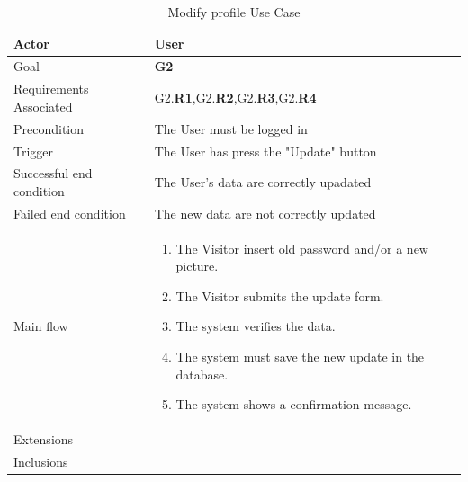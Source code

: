 \newline
\begin{table}[htb]
\begin{center}
\renewcommand{\arraystretch}{1.5}
\begin{tabular}{|l|p{}|}
\hline
Actor & User \\ \hline
Goal & \textbf{G2} \\ \hline
Requirements Associated & G2.\textbf{R1},G2.\textbf{R2},G2.\textbf{R3},G2.\textbf{R4} \\ \hline
Precondition & The User must be logged in \\ \hline
Trigger & The User has press the "Update" button \\ \hline
Successful end condition & The User's data are correctly upadated \\ \hline
Failed end condition & The new data are not correctly updated \\ \hline
Main flow & \begin{minipage}[t]{0.6\textwidth}
\begin{enumerate}
\addtolength{\itemindent}{0.5cm}
\item The Visitor insert old password and/or a new picture.
\item The Visitor submits the update form.
\item The system verifies the data.
\item The system must save the new update in the database.
\item The system shows a confirmation message.
\end{enumerate}
\end{minipage} \\ \hline
Extensions & \\ \hline
Inclusions &  \\ \hline
\end{tabular}
\caption{Modify profile Use Case}
\end{center}
\end{table}
\clearpage

